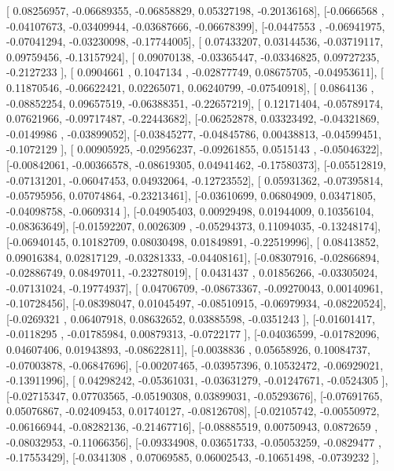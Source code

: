 \documentclass{article}
\begin{document}
       [ 0.08256957, -0.06689355, -0.06858829,  0.05327198, -0.20136168],
       [-0.0666568 , -0.04107673, -0.03409944, -0.03687666, -0.06678399],
       [-0.0447553 , -0.06941975, -0.07041294, -0.03230098, -0.17744005],
       [ 0.07433207,  0.03144536, -0.03719117,  0.09759456, -0.13157924],
       [ 0.09070138, -0.03365447, -0.03346825,  0.09727235, -0.2127233 ],
       [ 0.0904661 ,  0.1047134 , -0.02877749,  0.08675705, -0.04953611],
       [ 0.11870546, -0.06622421,  0.02265071,  0.06240799, -0.07540918],
       [ 0.0864136 , -0.08852254,  0.09657519, -0.06388351, -0.22657219],
       [ 0.12171404, -0.05789174,  0.07621966, -0.09717487, -0.22443682],
       [-0.06252878,  0.03323492, -0.04321869, -0.0149986 , -0.03899052],
       [-0.03845277, -0.04845786,  0.00438813, -0.04599451, -0.1072129 ],
       [ 0.00905925, -0.02956237, -0.09261855,  0.0515143 , -0.05046322],
       [-0.00842061, -0.00366578, -0.08619305,  0.04941462, -0.17580373],
       [-0.05512819, -0.07131201, -0.06047453,  0.04932064, -0.12723552],
       [ 0.05931362, -0.07395814, -0.05795956,  0.07074864, -0.23213461],
       [-0.03610699,  0.06804909,  0.03471805, -0.04098758, -0.0609314 ],
       [-0.04905403,  0.00929498,  0.01944009,  0.10356104, -0.08363649],
       [-0.01592207,  0.0026309 , -0.05294373,  0.11094035, -0.13248174],
       [-0.06940145,  0.10182709,  0.08030498,  0.01849891, -0.22519996],
       [ 0.08413852,  0.09016384,  0.02817129, -0.03281333, -0.04408161],
       [-0.08307916, -0.02866894, -0.02886749,  0.08497011, -0.23278019],
       [ 0.0431437 ,  0.01856266, -0.03305024, -0.07131024, -0.19774937],
       [ 0.04706709, -0.08673367, -0.09270043,  0.00140961, -0.10728456],
       [-0.08398047,  0.01045497, -0.08510915, -0.06979934, -0.08220524],
       [-0.0269321 ,  0.06407918,  0.08632652,  0.03885598, -0.0351243 ],
       [-0.01601417, -0.0118295 , -0.01785984,  0.00879313, -0.0722177 ],
       [-0.04036599, -0.01782096,  0.04607406,  0.01943893, -0.08622811],
       [-0.0038836 ,  0.05658926,  0.10084737, -0.07003878, -0.06847696],
       [-0.00207465, -0.03957396,  0.10532472, -0.06929021, -0.13911996],
       [ 0.04298242, -0.05361031, -0.03631279, -0.01247671, -0.0524305 ],
       [-0.02715347,  0.07703565, -0.05190308,  0.03899031, -0.05293676],
       [-0.07691765,  0.05076867, -0.02409453,  0.01740127, -0.08126708],
       [-0.02105742, -0.00550972, -0.06166944, -0.08282136, -0.21467716],
       [-0.08885519,  0.00750943,  0.0872659 , -0.08032953, -0.11066356],
       [-0.09334908,  0.03651733, -0.05053259, -0.0829477 , -0.17553429],
       [-0.0341308 ,  0.07069585,  0.06002543, -0.10651498, -0.0739232 ],
\end{document}
